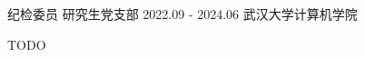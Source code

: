 

\begin{cventries}

  \cventry
    {纪检委员} %
    {研究生党支部} %
    {2022.09 - 2024.06} %
    {武汉大学计算机学院} %
    {
      \begin{cvitems} %
        \item {TODO}
      \end{cvitems}
    }

\end{cventries}
